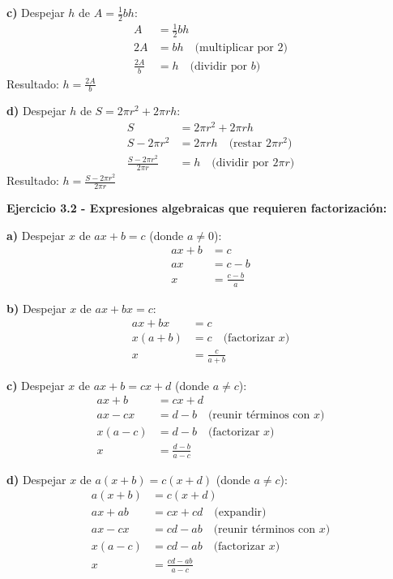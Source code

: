 \textbf{c)} Despejar $h$ de $A = \frac{1}{2}bh$:
\begin{align}
A &= \frac{1}{2}bh\\
2A &= bh \quad \text{(multiplicar por 2)}\\
\frac{2A}{b} &= h \quad \text{(dividir por $b$)}
\end{align}
Resultado: $h = \frac{2A}{b}$

\textbf{d)} Despejar $h$ de $S = 2\pi r^2 + 2\pi rh$:
\begin{align}
S &= 2\pi r^2 + 2\pi rh\\
S - 2\pi r^2 &= 2\pi rh \quad \text{(restar $2\pi r^2$)}\\
\frac{S - 2\pi r^2}{2\pi r} &= h \quad \text{(dividir por $2\pi r$)}
\end{align}
Resultado: $h = \frac{S - 2\pi r^2}{2\pi r}$

\textbf{Ejercicio 3.2 - Expresiones algebraicas que requieren factorización:}

\textbf{a)} Despejar $x$ de $ax + b = c$ (donde $a \neq 0$):
\begin{align}
ax + b &= c\\
ax &= c - b\\
x &= \frac{c - b}{a}
\end{align}

\textbf{b)} Despejar $x$ de $ax + bx = c$:
\begin{align}
ax + bx &= c\\
x(a + b) &= c \quad \text{(factorizar $x$)}\\
x &= \frac{c}{a + b}
\end{align}

\textbf{c)} Despejar $x$ de $ax + b = cx + d$ (donde $a \neq c$):
\begin{align}
ax + b &= cx + d\\
ax - cx &= d - b \quad \text{(reunir términos con $x$)}\\
x(a - c) &= d - b \quad \text{(factorizar $x$)}\\
x &= \frac{d - b}{a - c}
\end{align}

\textbf{d)} Despejar $x$ de $a(x + b) = c(x + d)$ (donde $a \neq c$):
\begin{align}
a(x + b) &= c(x + d)\\
ax + ab &= cx + cd \quad \text{(expandir)}\\
ax - cx &= cd - ab \quad \text{(reunir términos con $x$)}\\
x(a - c) &= cd - ab \quad \text{(factorizar $x$)}\\
x &= \frac{cd - ab}{a - c}
\end{align}

